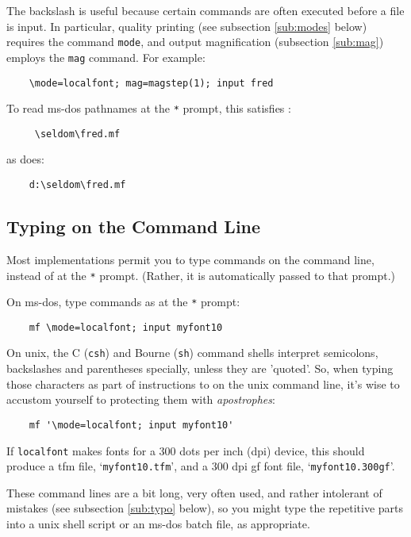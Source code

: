 The backslash is useful because
certain commands are often executed before a \MF{} file is input.
In particular, quality printing
(see subsection \ref{sub:modes} below)
requires the \MF{} command {\tt mode},
and output magnification
(subsection \ref{sub:mag})
employs the {\tt mag} command.
For example:
\begin{verbatim}
    \mode=localfont; mag=magstep(1); input fred
\end{verbatim}

To read {\sc ms-dos} pathnames at the {\tt **} prompt,
this satisfies \MF{}:
\begin{verbatim}
     \seldom\fred.mf
\end{verbatim}
as does:
\begin{verbatim}
    d:\seldom\fred.mf
\end{verbatim}


\subsection{Typing on the Command Line}\label{sub:cmdline}

Most \MF{} implementations permit you to type \MF{} commands on the
command line, instead of at the {\tt **} prompt.  (Rather, it is
automatically passed to that prompt.)

On {\sc ms-dos}, type commands as at the {\tt **} prompt:
\begin{verbatim}
    mf \mode=localfont; input myfont10
\end{verbatim}

On {\sc unix}, the C ({\tt csh}) and Bourne ({\tt sh}) command shells
interpret semicolons, backslashes and parentheses specially, unless
they are 'quoted'.
So, when typing those characters as part of instructions to \MF{}
on the {\sc unix} command line, it's wise to accustom
yourself to protecting them with {\em apostrophes\/}:
\begin{verbatim}
    mf '\mode=localfont; input myfont10'
\end{verbatim}
If {\tt localfont} makes fonts for a 300 dots per inch (dpi) device,
this should produce a {\sc tfm} file, `{\tt myfont10.tfm}',
and a 300 dpi {\sc gf} font file, `{\tt myfont10.300gf}'.

These command lines are a bit long, very often used, and rather
intolerant of mistakes (see subsection \ref{sub:typo} below),
so you might type the repetitive parts into a {\sc unix} shell script
or an {\sc ms-dos} batch file, as appropriate.

